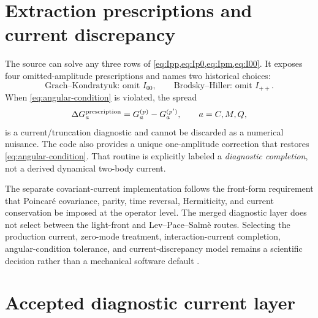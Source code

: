 \documentclass[11pt,oneside]{book}
\begin{document}
\section{Extraction prescriptions and current discrepancy}

The source can solve any three rows of \cref{eq:Ipp,eq:Ip0,eq:Ipm,eq:I00}.  It exposes four omitted-amplitude prescriptions and names two historical choices:
\begin{equation}
 \text{Grach--Kondratyuk: omit }I_{00},
 \qquad
 \text{Brodsky--Hiller: omit }I_{++}.
 \label{eq:named-current-prescriptions}
\end{equation}
When \cref{eq:angular-condition} is violated, the spread
\begin{equation}
 \Delta G_a^{\rm prescription}
 =G_a^{(p)}-G_a^{(p')},
 \qquad a=C,M,Q,
 \label{eq:prescription-spread}
\end{equation}
is a current/truncation diagnostic and cannot be discarded as a numerical nuisance.  The code also provides a unique one-amplitude correction that restores \cref{eq:angular-condition}.  That routine is explicitly labeled a \emph{diagnostic completion}, not a derived dynamical two-body current.

The separate covariant-current implementation follows the front-form requirement that Poincar\'e covariance, parity, time reversal, Hermiticity, and current conservation be imposed at the operator level.  The merged diagnostic layer does not select between the light-front and Lev--Pace--Salm\`e routes.  Selecting the production current, zero-mode treatment, interaction-current completion, angular-condition tolerance, and current-discrepancy model remains a scientific decision rather than a mechanical software default \cite{LevPaceSalme2000,CarlsonJi2003,deMeloFrederico2003,DWC400S2Record2026}.

\section{Accepted diagnostic current layer}
\label{sec:accepted-current-layer}
\end{document}
